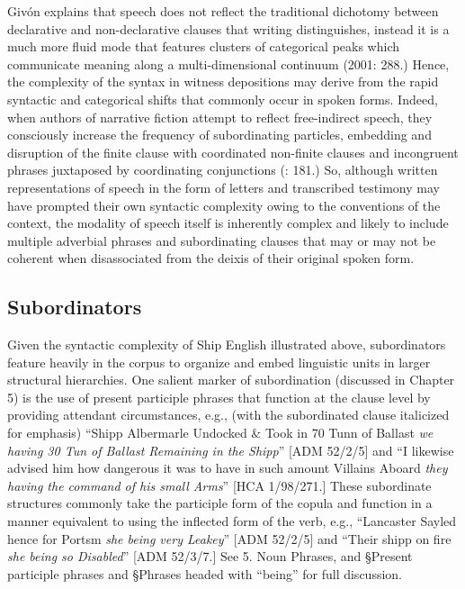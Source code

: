 Givón explains that speech does not reflect the traditional dichotomy between declarative and non-declarative clauses that writing distinguishes, instead it is a much more fluid mode that features clusters of categorical peaks which communicate meaning along a multi-dimensional continuum (2001: 288.) Hence, the complexity of the syntax in witness depositions may derive from the rapid syntactic and categorical shifts that commonly occur in spoken forms. Indeed, when authors of narrative fiction attempt to reflect free-indirect speech, they consciously increase the frequency of subordinating particles, embedding and disruption of the finite clause with coordinated non-finite clauses and incongruent phrases juxtaposed by coordinating conjunctions (\citealt{Sotirova2016}: 181.) So, although written representations of speech in the form of letters and transcribed testimony may have prompted their own syntactic complexity owing to the conventions of the context, the modality of speech itself is inherently complex and likely to include multiple adverbial phrases and subordinating clauses that may or may not be coherent when disassociated from the deixis of their original spoken form.   

\subsection{{Subordinators}}%

  Given the syntactic complexity of Ship English illustrated above, subordinators feature heavily in the corpus to organize and embed linguistic units in larger structural hierarchies. One salient marker of subordination (discussed in Chapter 5) is the use of present participle phrases that function at the clause level by providing attendant circumstances, e.g., (with the subordinated clause italicized for emphasis) “Shipp Albermarle Undocked \& Took in 70 Tunn of Ballast \textit{we having 30 Tun of Ballast Remaining in the Shipp}” [ADM 52/2/5] and “I likewise advised him how dangerous it was to have in such amount Villains Aboard \textit{they having the command of his small Arms}” [HCA 1/98/271.] These subordinate structures commonly take the participle form of the copula and function in a manner equivalent to using the inflected form of the verb, e.g., “Lancaster Sayled hence for Portsm \textit{she being very Leakey}” [ADM 52/2/5] and “Their shipp on fire \textit{she being so Disabled}” [ADM 52/3/7.] See 5. Noun Phrases, and §Present participle phrases and §Phrases headed with “being” for full discussion.


